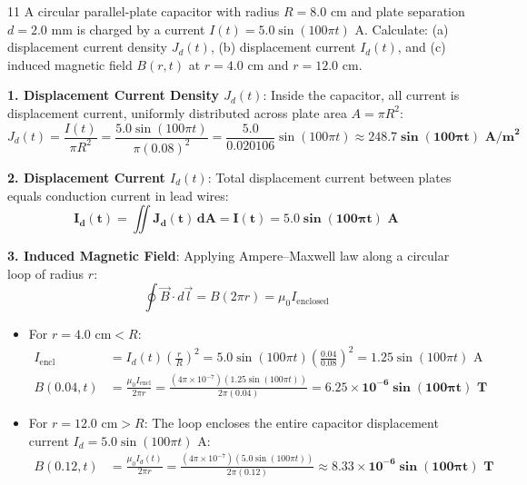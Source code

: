\begin{theoryq}{11}
A circular parallel-plate capacitor with radius $R = 8.0\text{ cm}$ and plate separation $d = 2.0\text{ mm}$ is charged by a current $I(t) = 5.0\sin(100\pi t)\text{ A}$. Calculate: (a) displacement current density $J_d(t)$, (b) displacement current $I_d(t)$, and (c) induced magnetic field $B(r,t)$ at $r = 4.0\text{ cm}$ and $r = 12.0\text{ cm}$.
\end{theoryq}
\begin{theorysol}
\textbf{1. Displacement Current Density $J_d(t)$}:
Inside the capacitor, all current is displacement current, uniformly distributed across plate area $A = \pi R^2$:
\begin{equation}
J_d(t) = \frac{I(t)}{\pi R^2} = \frac{5.0\sin(100\pi t)}{\pi (0.08)^2} = \frac{5.0}{0.020106}\sin(100\pi t) \approx \mathbf{248.7\sin(100\pi t)\text{ A/m}^2}
\end{equation}

\textbf{2. Displacement Current $I_d(t)$}:
Total displacement current between plates equals conduction current in lead wires:
\begin{equation}
\mathbf{I_d(t) = \iint J_d(t)\,dA = I(t) = 5.0\sin(100\pi t)\text{ A}}
\end{equation}

\textbf{3. Induced Magnetic Field}:
Applying Ampere--Maxwell law along a circular loop of radius $r$:
\begin{equation}
\oint \vec{B}\cdot d\vec{l} = B(2\pi r) = \mu_0 I_{\text{enclosed}}
\end{equation}
\begin{itemize}
    \item For $r = 4.0\text{ cm} < R$:
    \begin{align*}
    I_{\text{encl}} &= I_d(t)\left(\frac{r}{R}\right)^2 = 5.0\sin(100\pi t)\left(\frac{0.04}{0.08}\right)^2 = 1.25\sin(100\pi t)\text{ A} \\
    B(0.04, t) &= \frac{\mu_0 I_{\text{encl}}}{2\pi r} = \frac{(4\pi \times 10^{-7})(1.25\sin(100\pi t))}{2\pi (0.04)} = \mathbf{6.25 \times 10^{-6}\sin(100\pi t)\text{ T}}
    \end{align*}
    \item For $r = 12.0\text{ cm} > R$:
    The loop encloses the entire capacitor displacement current $I_d = 5.0\sin(100\pi t)\text{ A}$:
    \begin{align*}
    B(0.12, t) &= \frac{\mu_0 I_d(t)}{2\pi r} = \frac{(4\pi \times 10^{-7})(5.0\sin(100\pi t))}{2\pi (0.12)} \approx \mathbf{8.33 \times 10^{-6}\sin(100\pi t)\text{ T}}
    \end{align*}
\end{itemize}
\end{theorysol}
\vspace{4mm}

